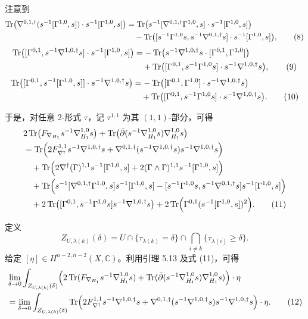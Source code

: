 注意到
\begin{align}
\operatorname{Tr}\bigl(\nabla^{0,1,\dagger}(s^{-1}[\Gamma^{1,0},s])\cdot s^{-1}[\Gamma^{1,0},s]\bigr)
&=
\operatorname{Tr}\bigl(s^{-1}[\nabla^{0,1,\dagger}\Gamma^{1,0},s]\cdot s^{-1}[\Gamma^{1,0},s]\bigr)\nonumber\\
&\quad
-\operatorname{Tr}\bigl([s^{-1}\Gamma^{1,0}s,s^{-1}\nabla^{0,1,\dagger}s]\cdot s^{-1}[\Gamma^{1,0},s]\bigr), \tag{8}
\end{align}
\begin{align}
\operatorname{Tr}\bigl([\Gamma^{0,1},s^{-1}\nabla^{1,0,\dagger}s]\cdot s^{-1}[\Gamma^{1,0},s]\bigr)
&=
-\operatorname{Tr}\bigl(s^{-1}\nabla^{1,0,\dagger}s\cdot[\Gamma^{0,1},\Gamma^{1,0}]\bigr)\nonumber\\
&\quad
+\operatorname{Tr}\bigl([\Gamma^{0,1},s^{-1}\Gamma^{1,0}s]\cdot s^{-1}\nabla^{1,0,\dagger}s\bigr), \tag{9}
\end{align}
\begin{align}
\operatorname{Tr}\bigl([\Gamma^{0,1},s^{-1}[\Gamma^{1,0},s]]\cdot s^{-1}\nabla^{1,0,\dagger}s\bigr)
&=
-\operatorname{Tr}\bigl([\Gamma^{0,1},\Gamma^{1,0}]\cdot s^{-1}\nabla^{1,0,\dagger}s\bigr)\nonumber\\
&\quad
+\operatorname{Tr}\bigl([\Gamma^{0,1},s^{-1}\Gamma^{1,0}s]\cdot s^{-1}\nabla^{1,0,\dagger}s\bigr). \tag{10}
\end{align}

于是，对任意 2-形式 \(\tau\)，记 \(\tau^{1,1}\) 为其 \((1,1)\)-部分，可得
\begin{align}
&2\operatorname{Tr}\bigl(F_{\nabla_{H_1}}s^{-1}\nabla^{1,0}_{H_1}s\bigr)
+\operatorname{Tr}\bigl(\bar\partial(s^{-1}\nabla^{1,0}_{H_1}s)\nabla^{1,0}_{H_1}s\bigr)\nonumber\\
&=
\operatorname{Tr}\Bigl(
2F_{\nabla^\dagger}^{1,1}s^{-1}\nabla^{1,0,\dagger}s
+\nabla^{0,1,\dagger}(s^{-1}\nabla^{1,0,\dagger}s)s^{-1}\nabla^{1,0,\dagger}s
\Bigr)\nonumber\\
&\quad
+\operatorname{Tr}\Bigl(
2\nabla^\dagger(\Gamma)^{1,1}s^{-1}[\Gamma^{1,0},s]
+
2(\Gamma\wedge\Gamma)^{1,1}s^{-1}[\Gamma^{1,0},s]
\Bigr)\nonumber\\
&\quad
+\operatorname{Tr}\Bigl(
s^{-1}[\nabla^{0,1,\dagger}\Gamma^{1,0},s]s^{-1}[\Gamma^{1,0},s]
-
[s^{-1}\Gamma^{1,0}s,s^{-1}\nabla^{0,1,\dagger}s]s^{-1}[\Gamma^{1,0},s]
\Bigr)\nonumber\\
&\quad
+2\operatorname{Tr}\bigl([\Gamma^{0,1},s^{-1}\Gamma^{1,0}s]s^{-1}\nabla^{1,0,\dagger}s\bigr)
+2\operatorname{Tr}\Bigl(\Gamma^{0,1}(s^{-1}[\Gamma^{1,0},s])^2\Bigr). \tag{11}
\end{align}

定义
\[
Z_{U,\lambda(k)}(\delta)
=
U\cap \{\tau_{\lambda(k)}=\delta\}\cap \bigcap_{i\ne k}\{\tau_{\lambda(i)}\ge \delta\}.
\]
给定 \([\eta]\in H^{n-2,n-2}(X,\mathbb C)\)。利用引理 5.13 及式 (11)，可得
\begin{align}
&\lim_{\delta\to 0}
\int_{Z_{U,\lambda(k)}(\delta)}
\Bigl(
2\operatorname{Tr}(F_{\nabla_{H_1}}s^{-1}\nabla^{1,0}_{H_1}s)
+
\operatorname{Tr}(\bar\partial(s^{-1}\nabla^{1,0}_{H_1}s)\nabla^{1,0}_{H_1}s)
\Bigr)\cdot \eta
\nonumber\\
&=
\lim_{\delta\to 0}
\int_{Z_{U,\lambda(k)}(\delta)}
\operatorname{Tr}\Bigl(
2F_{\nabla^\dagger}^{1,1}s^{-1}\nabla^{1,0,\dagger}s
+
\nabla^{0,1,\dagger}(s^{-1}\nabla^{1,0,\dagger}s)s^{-1}\nabla^{1,0,\dagger}s
\Bigr)\cdot \eta. \tag{12}
\end{align}


